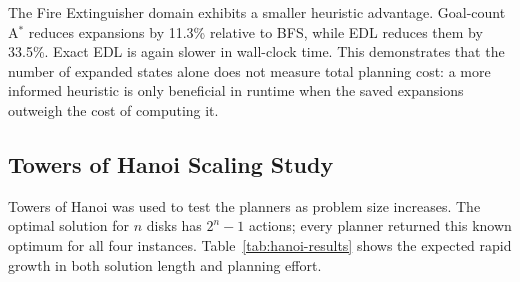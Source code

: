 The Fire Extinguisher domain exhibits a smaller heuristic advantage.  Goal-count
A$^\ast$ reduces expansions by 11.3\% relative to BFS, while EDL reduces them by
33.5\%.  Exact EDL is again slower in wall-clock time.  This demonstrates that
the number of expanded states alone does not measure total planning cost: a more
informed heuristic is only beneficial in runtime when the saved expansions
outweigh the cost of computing it.

\subsection{Towers of Hanoi Scaling Study}

Towers of Hanoi was used to test the planners as problem size increases.  The
optimal solution for $n$ disks has $2^n-1$ actions; every planner returned this
known optimum for all four instances.  Table~\ref{tab:hanoi-results} shows the
expected rapid growth in both solution length and planning effort.

\begin{table}[t]
    \centering
    \caption{Towers of Hanoi scaling results.}
    \label{tab:hanoi-results}
\end{table}

